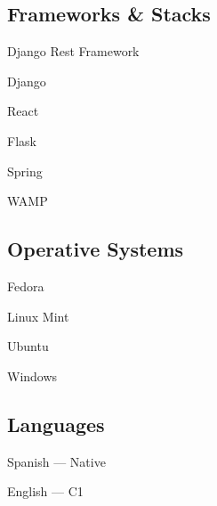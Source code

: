 \begin{multicols}{2}
	\subsection{Frameworks \& Stacks}	
	\reducespace
	\begin{multicols}{2}\raggedcolumns%
		\begin{cvlist}
			\item Django Rest Framework%
			\item Django%
			\item React%
			\item Flask%
			\item Spring%
			\item WAMP%
		\end{cvlist}
	\end{multicols}

	\subsection{Operative Systems}
	\reducespace
	\begin{multicols}{2}\raggedcolumns%
		\begin{cvlist}
			\item Fedora
			\item Linux Mint
			\item Ubuntu
			\item Windows
		\end{cvlist}
	\end{multicols}
	
	\subsection{Languages}
	\reducespace
	\begin{multicols}{2}\raggedcolumns%
		\begin{cvlist}
			\item Spanish --- Native
			\item English --- C1
		\end{cvlist}
	\end{multicols}
\end{multicols}
\reducespace

\separator

